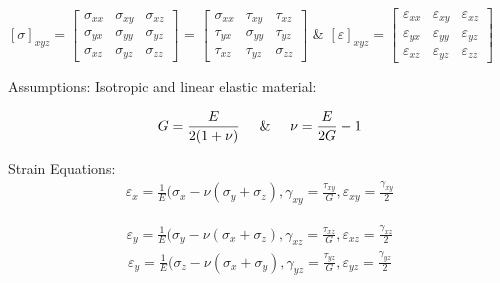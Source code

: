 \begin{center} 
$[\sigma]_{xyz} = \begin{bmatrix}
\sigma_{xx} & \sigma_{xy}  & \sigma_{xz} \\
\sigma_{yx} & \sigma_{yy}  & \sigma_{yz} \\
\sigma_{xz} & \sigma_{yz}  & \sigma_{zz} 
\end{bmatrix}$ = 
$\begin{bmatrix} \sigma_{xx} & \tau_{xy}  & \tau_{xz} \\
\tau_{yx} & \sigma_{yy}  & \tau_{yz} \\
\tau_{xz} & \tau_{yz}  & \sigma_{zz} 
\end{bmatrix}$
\hspace{0.5cm} \& \hspace{0.5cm}
$[\varepsilon]_{xyz} = \begin{bmatrix}
\varepsilon_{xx} & \varepsilon_{xy}  & \varepsilon_{xz} \\
\varepsilon_{yx} & \varepsilon_{yy}  & \varepsilon_{yz} \\
\varepsilon_{xz} & \varepsilon_{yz}  & \varepsilon_{zz} 
\end{bmatrix}$

\vspace{2em}
Assumptions:
Isotropic and linear elastic material:

\begin{gather}
    G = \frac{E} {2(1+\nu)}
\hspace{0.5cm} \& \hspace{0.5cm}
\nu = \frac{E}{2G} - 1
\end{gather}

Strain Equations:
\begin{gather}
    \varepsilon_{x} = \frac{1} {E}(\sigma_{x} - \nu(\sigma_{y}+\sigma_{z}), \gamma_{xy} = \frac{\tau_{xy}}{G}, \varepsilon_{xy} = \frac{\gamma_{xy}}{2}
\end{gather}

\begin{gather}
    \varepsilon_{y} = \frac{1} {E}(\sigma_{y} - \nu(\sigma_{x}+\sigma_{z}), \gamma_{xz} = \frac{\tau_{xz}}{G}, \varepsilon_{xz} = \frac{\gamma_{xz}}{2}
\end{gather}
\begin{gather}
    \varepsilon_{y} = \frac{1} {E}(\sigma_{z} - \nu(\sigma_{x}+\sigma_{y}), \gamma_{yz} = \frac{\tau_{yz}}{G}, \varepsilon_{yz} = \frac{\gamma_{yz}}{2}
\end{gather}


\end{center}
